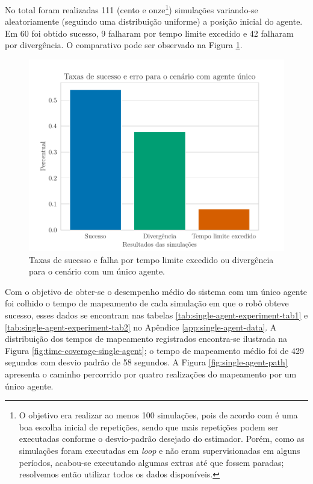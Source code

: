 No total foram realizadas 111 (cento e onze\footnote{O objetivo era realizar ao menos 100 simulações, pois de acordo com  é uma boa escolha inicial de repetições, sendo que mais repetições podem ser executadas conforme o desvio-padrão desejado do estimador. Porém, como as simulações foram executadas em \textit{loop} e não eram supervisionadas em alguns períodos, acabou-se executando algumas extras até que fossem paradas; resolvemos então utilizar todos os dados disponíveis.}) simulações variando-se aleatoriamente (seguindo uma distribuição uniforme) a posição inicial do agente. Em 60 foi obtido 
sucesso, 9 falharam por tempo limite excedido e 42 falharam por 
divergência. O comparativo pode ser observado na Figura \ref{fig:exp-single-robot-sucess-rate}.
\begin{figure}
  \centering
  \includegraphics[width=.7\textwidth]{figs/success_rate_bar_single_robot.pdf}
  \caption[Taxas de sucesso e falha para simulações com um único agente]{Taxas de sucesso e falha por tempo limite excedido ou divergência para o cenário com um único agente.}
  \label{fig:exp-single-robot-sucess-rate}
\end{figure}

Com o objetivo de obter-se o desempenho médio do sistema com um único 
agente foi colhido o tempo de mapeamento de cada simulação em que o
robô obteve sucesso, esses dados se encontram nas tabelas \ref{tab:single-agent-experiment-tab1} e \ref{tab:single-agent-experiment-tab2} no Apêndice 
\ref{app:single-agent-data}. A distribuição dos tempos de mapeamento 
registrados encontra-se ilustrada na Figura \ref{fig:time-coverage-single-agent}; o tempo de mapeamento médio foi de 
429 segundos com desvio padrão de 58 segundos. A Figura \ref{fig:single-agent-path} apresenta o caminho percorrido por quatro 
realizações do mapeamento por um único agente.

